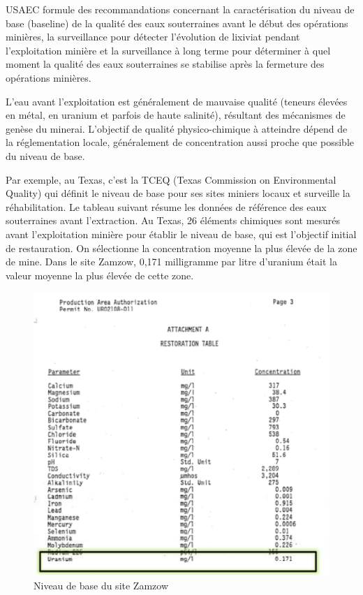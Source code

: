 \documentclass{article}
\begin{document}
USAEC formule des recommandations concernant la caractérisation du niveau de base (baseline) de la qualité des eaux souterraines avant le début des opérations minières, la surveillance pour détecter l’évolution de lixiviat pendant l'exploitation minière et la surveillance à long terme pour déterminer à quel moment la qualité des eaux souterraines se stabilise après la fermeture des opérations minières.

L'eau avant l'exploitation est généralement de mauvaise qualité (teneurs élevées en métal, en uranium et parfois de haute salinité), résultant des mécanismes de genèse du minerai. L'objectif de qualité physico-chimique à atteindre dépend de la réglementation locale, généralement de concentration aussi proche que possible du niveau de base.

Par exemple, au Texas, c’est la TCEQ (Texas Commission on Environmental Quality) qui définit le niveau de base pour ses sites miniers locaux et surveille la réhabilitation. Le tableau suivant résume les données de référence des eaux souterraines avant l'extraction. Au Texas, 26 éléments chimiques sont mesurés avant l'exploitation minière pour établir le niveau de base, qui est l’objectif initial de restauration. On sélectionne la concentration moyenne la plus élevée de la zone de mine. Dans le site Zamzow, 0,171 milligramme par litre d'uranium était la valeur moyenne la plus élevée de cette zone.

\begin{figure}[H]
    \centering
    \includegraphics[width=0.8\linewidth]{II_C_2.png}
    \caption{Niveau de base du site Zamzow}
    \label{fig:site_zamzow_base}
\end{figure}
\end{document}
